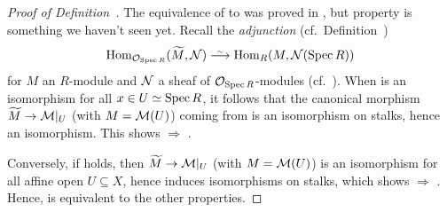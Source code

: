 \documentclass[a4paper,parskip=half,numbers=enddot, DIV=12]{scrreprt}
\begin{document}
\begin{proof}[Proof of Definition~]
	 The equivalence of   to  was proved in \cite[Proposition~1.5.1]{alggeo1}, but property  is something we haven't seen yet. Recall the \emph{adjunction} (cf.\ Definition~)
	\begin{align}\lbl{eq:ROXAdjunction}
		\Hom_{\Oo_{\Spec R}}(\snake{M}, \Nn)\isomorphism\Hom_R(M,\Nn(\Spec R))
	\end{align}
	for $M$ an $R$-module and $\mathcal{N}$ a sheaf of $\mathcal{O}_{\operatorname{Spec} R}$-modules (cf.\ \cite[Proposition~1.4.3]{alggeo1}). When  is an isomorphism for all $x\in U\simeq\operatorname{Spec} R$, it follows that the canonical morphism $\snake{M}\morphism\Mm|_U$ (with $M=\mathcal{M}(U)$) coming from  is an isomorphism on stalks, hence an isomorphism. This shows  $\Rightarrow$ .
	
	Conversely, if  holds, then $\snake{M}\morphism\Mm|_U$ (with $M=\mathcal{M}(U)$) is an isomorphism for all affine open $U\subseteq X$, hence induces isomorphisms on stalks, which shows  $\Rightarrow$ . Hence,  is equivalent to the other properties.
\end{proof}
\end{document}
